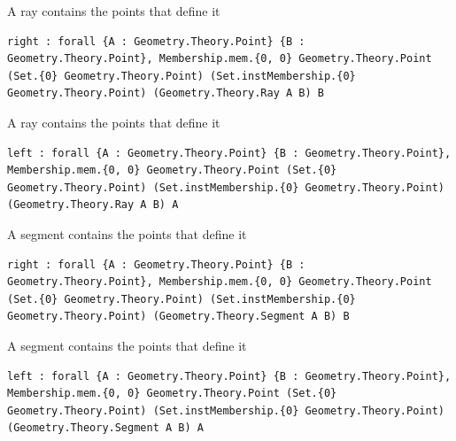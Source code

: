 
\begin{theorem}
  \label{Geometry.Theory.Line.ray_has_endpoints.right}
  \leanok
  A ray contains the points that define it 
\begin{verbatim}right : forall {A : Geometry.Theory.Point} {B : Geometry.Theory.Point}, Membership.mem.{0, 0} Geometry.Theory.Point (Set.{0} Geometry.Theory.Point) (Set.instMembership.{0} Geometry.Theory.Point) (Geometry.Theory.Ray A B) B\end{verbatim}
\end{theorem}

\begin{theorem}
  \label{Geometry.Theory.Line.ray_has_endpoints.left}
  \leanok
  A ray contains the points that define it 
\begin{verbatim}left : forall {A : Geometry.Theory.Point} {B : Geometry.Theory.Point}, Membership.mem.{0, 0} Geometry.Theory.Point (Set.{0} Geometry.Theory.Point) (Set.instMembership.{0} Geometry.Theory.Point) (Geometry.Theory.Ray A B) A\end{verbatim}
\end{theorem}


\begin{theorem}
  \label{Geometry.Theory.Line.seg_has_endpoints.right}
  \leanok
  A segment contains the points that define it 
\begin{verbatim}right : forall {A : Geometry.Theory.Point} {B : Geometry.Theory.Point}, Membership.mem.{0, 0} Geometry.Theory.Point (Set.{0} Geometry.Theory.Point) (Set.instMembership.{0} Geometry.Theory.Point) (Geometry.Theory.Segment A B) B\end{verbatim}
\end{theorem}

\begin{theorem}
  \label{Geometry.Theory.Line.seg_has_endpoints.left}
  \leanok
  A segment contains the points that define it 
\begin{verbatim}left : forall {A : Geometry.Theory.Point} {B : Geometry.Theory.Point}, Membership.mem.{0, 0} Geometry.Theory.Point (Set.{0} Geometry.Theory.Point) (Set.instMembership.{0} Geometry.Theory.Point) (Geometry.Theory.Segment A B) A\end{verbatim}
\end{theorem}

